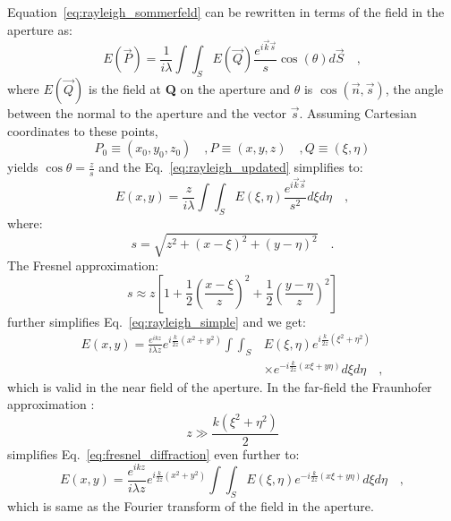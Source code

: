 Equation~\eqref{eq:rayleigh_sommerfeld} can be rewritten in terms of the field in the aperture as:
\begin{equation}
\label{eq:rayleigh_updated}
E(\vec{P}) = \frac{1}{i\lambda}\int \int _S E(\vec{Q}) \frac{e^{i\vec{k}\vec{s}}}{s} \cos (\theta) d\vec{S} \quad ,
\end{equation}
where $E(\vec{Q})$ is the field at \textbf{Q} on the aperture and $\theta$ is $\cos (\vec{n},\vec{s})$, the angle between the normal to the aperture and the vector $\vec{s}$. Assuming Cartesian coordinates to these points,
\begin{subequations}
\begin{equation}
P_0 \equiv \left(x_0, y_0, z_0\right) \quad ,
\end{equation}
\begin{equation}
P \equiv \left(x, y, z\right) \quad ,
\end{equation}
\begin{equation}
Q \equiv \left( \xi , \eta \right) 
\end{equation}
\end{subequations}
yields $\cos \theta = \frac{z}{s}$ and the Eq.~\eqref{eq:rayleigh_updated} simplifies to:
\begin{equation}
\label{eq:rayleigh_simple}
E\left( x,y\right) = \frac{z}{i\lambda}\int \int _S E(\xi,\eta) \frac{e^{i\vec{k}\vec{s}}}{s^2} d\xi d\eta \quad ,
\end{equation}
where:
\begin{equation}
s = \sqrt{z^2 + \left( x - \xi \right) ^2 + \left( y-\eta \right) ^2} \quad .
\end{equation}
The Fresnel approximation:
\begin{equation}
\label{eq:fresnel_approx}
s \approx z\left[ 1 + \frac{1}{2}\left(\frac{x-\xi}{z}\right)^2 + \frac{1}{2}\left(\frac{y-\eta}{z}\right)^2\right]
\end{equation}
further simplifies Eq.~\eqref{eq:rayleigh_simple} and we get:
\begin{equation}
\label{eq:fresnel_diffraction}
\begin{split}
E\left( x,y\right) = \frac{e^{ikz}}{i\lambda z}e^{i\frac{k}{2z}(x^2+y^2)}\int \int _{S} & E\left( \xi , \eta \right) e^{i\frac{k}{2z}(\xi^2+\eta ^2)} \\
& \times e^{-i\frac{k}{2z}(x\xi+y\eta)} d\xi d\eta \quad ,
\end{split}
\end{equation}
which is valid in the near field of the aperture. In the far-field the Fraunhofer approximation \cite{goodmanfourier}:
\begin{equation}
\label{eq:fraunhofer_approx}
z \gg \frac{k\left( \xi ^2 + \eta ^2\right)}{2}
\end{equation}
simplifies Eq.~\eqref{eq:fresnel_diffraction} even further to:
\begin{equation}
\label{eq:fraunhofer_diffraction}
E\left( x,y\right) = \frac{e^{ikz}}{i\lambda z}e^{i\frac{k}{2z}(x^2+y^2)}\int \int _{S}  E \left( \xi , \eta \right) e^{-i\frac{k}{2z}(x\xi+y\eta )} d\xi d\eta \quad ,
\end{equation}
which is same as the Fourier transform of the field in the aperture.


